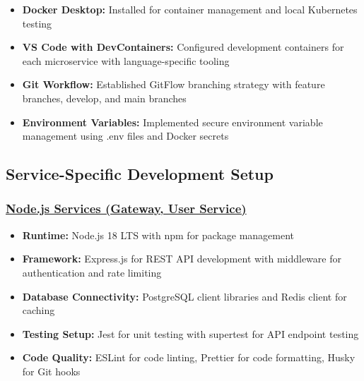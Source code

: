 \begin{itemize}
    \item \textbf{Docker Desktop:} Installed for container management and local Kubernetes testing
    \item \textbf{VS Code with DevContainers:} Configured development containers for each microservice with language-specific tooling
    \item \textbf{Git Workflow:} Established GitFlow branching strategy with feature branches, develop, and main branches
    \item \textbf{Environment Variables:} Implemented secure environment variable management using .env files and Docker secrets
\end{itemize}

\subsection{Service-Specific Development Setup}

\subsubsection*{\underline{Node.js Services (Gateway, User Service)}}
\begin{itemize}
    \item \textbf{Runtime:} Node.js 18 LTS with npm for package management
    \item \textbf{Framework:} Express.js for REST API development with middleware for authentication and rate limiting
    \item \textbf{Database Connectivity:} PostgreSQL client libraries and Redis client for caching
    \item \textbf{Testing Setup:} Jest for unit testing with supertest for API endpoint testing
    \item \textbf{Code Quality:} ESLint for code linting, Prettier for code formatting, Husky for Git hooks
\end{itemize}

